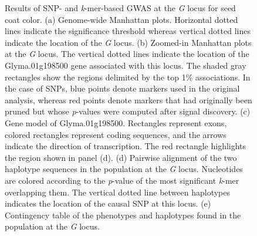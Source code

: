 \documentclass[doublespacing]{bmcart}
\begin{document}
\begin{backmatter}
\begin{figure}[p]
	\caption{Results of SNP- and \textit{k}-mer-based GWAS at the
	\textit{G} locus for seed coat color. (a) Genome-wide Manhattan plots.
	Horizontal dotted lines indicate the significance
	threshold whereas vertical dotted lines indicate the location of the
	\textit{G} locus. (b) Zoomed-in Manhattan plots at the \textit{G} locus.
	The vertical dotted lines indicate the location of the
	Glyma.01g198500 gene associated with this locus. The shaded gray
	rectangles show the regions delimited by the top 1\% associations.
	In the case of SNPs, blue points denote markers used in the
	original analysis, whereas red points denote markers that had originally
	been pruned but whose \emph{p}-values were computed after signal
	discovery.
	(c) Gene model of Glyma.01g198500. Rectangles represent exons, colored
	rectangles represent coding sequences, and the arrows indicate the
	direction of transcription. The red rectangle highlights the region
	shown in panel (d). (d) Pairwise alignment of the two haplotype
	sequences in the population at the \textit{G} locus. Nucleotides are
	colored according to the
	\textit{p}-value of the most significant \textit{k}-mer overlapping
	them. The vertical dotted line between haplotypes indicates the location of
	the causal SNP at this locus. (e) Contingency table of
	the phenotypes and haplotypes found in the population at the
	\textit{G} locus.}
	\label{seed-coat-color-main-figure}
\end{figure}


\end{backmatter}
\end{document}
